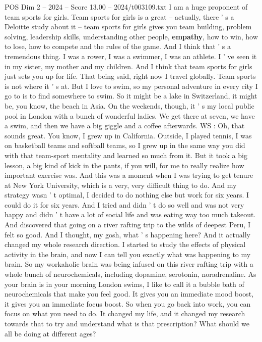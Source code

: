 \begin{textsample}{POS Dim 2 – 2024 – Score 13.00 – 2024/t003109.txt}
I am a huge proponent of team sports for girls.
Team sports for girls is a great -- actually, there ' s a Deloitte study about it -- team sports for girls gives you team building, problem solving, leadership skills, understanding other people, \textbf{empathy}, how to win, how to lose, how to compete and the rules of the game.
And I think that ' s a tremendous thing.
I was a rower, I was a swimmer, I was an athlete.
I ' ve seen it in my sister, my mother and my children.
And I think that team sports for girls just sets you up for life.
That being said, right now I travel globally.
Team sports is not where it ' s at.
But I love to swim, so my personal adventure in every city I go to is to find somewhere to swim.
So it might be a lake in Switzerland, it might be, you know, the beach in Asia.
On the weekends, though, it ' s my local public pool in London with a bunch of wonderful ladies.
We get there at seven, we have a swim, and then we have a big giggle and a coffee afterwards.
WS : Oh, that sounds great.
You know, I grew up in California.
Outside, I played tennis, I was on basketball teams and softball teams, so I grew up in the same way you did with that team-sport mentality and learned so much from it.
But it took a big lesson, a big kind of kick in the pants, if you will, for me to really realize how important exercise was.
And this was a moment when I was trying to get tenure at New York University, which is a very, very difficult thing to do.
And my strategy wasn ' t optimal, I decided to do nothing else but work for six years.
I could do it for six years.
And I tried and didn ' t do so well and was not very happy and didn ' t have a lot of social life and was eating way too much takeout.
And discovered that going on a river rafting trip to the wilds of deepest Peru, I felt so good.
And I thought, my gosh, what ' s happening here?
And it actually changed my whole research direction.
I started to study the effects of physical activity in the brain, and now I can tell you exactly what was happening to my brain.
So my workaholic brain was being infused on this river rafting trip with a whole bunch of neurochemicals, including dopamine, serotonin, noradrenaline.
As your brain is in your morning London swims, I like to call it a bubble bath of neurochemicals that make you feel good.
It gives you an immediate mood boost, it gives you an immediate focus boost.
So when you go back into work, you can focus on what you need to do.
It changed my life, and it changed my research towards that to try and understand what is that prescription?
What should we all be doing at different ages?

\end{textsample}
